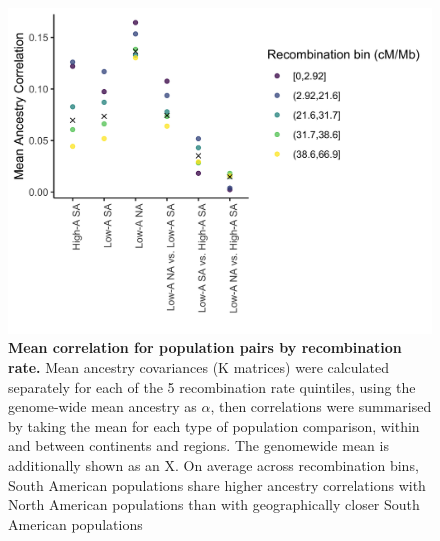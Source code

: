 \begin{figure}[ht]
\includegraphics[width=\textwidth]{chapter1/figures/mean_k_corr_by_groups_and_r.png}
\caption{ \textbf{Mean correlation for population pairs by recombination rate.} Mean ancestry covariances (K matrices) were calculated separately for each of the 5 recombination rate quintiles, using the genome-wide mean ancestry as $\alpha$, then correlations were summarised by taking the mean for each type of population comparison, within and between continents and  regions.  The genomewide mean is additionally shown as an X. On average across recombination bins,  South American populations share higher ancestry correlations with  North American populations than with geographically closer  South American populations }
\label{fig_mean_k_by_r}
\end{figure}

